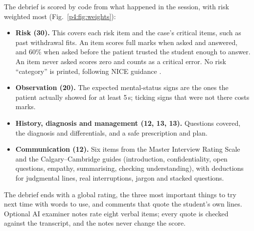\documentclass[journal]{IEEEtran}
\begin{document}
The debrief is scored by code from what happened in the session, with risk weighted most (Fig.~\ref{p4:fig:weights}):
\begin{itemize}
\item \textbf{Risk (30).} This covers each risk item and the case's critical items, such as past withdrawal fits. An item scores full marks when asked and answered, and 60\% when asked before the patient trusted the student enough to answer. An item never asked scores zero and counts as a critical error. No risk ``category'' is printed,
following NICE guidance \cite{nice2022ng225}.
\item \textbf{Observation (20).} The expected mental-status signs are the ones the patient actually showed for at least 5\,s; ticking signs that were not
there costs marks.
\item \textbf{History, diagnosis and management (12, 13, 13).} Questions covered, the diagnosis and differentials, and a safe prescription and plan.
\item \textbf{Communication (12).} Six items from the Master Interview Rating Scale and the Calgary--Cambridge guides \cite{simmenroth2014calgary}
(introduction, confidentiality, open questions, empathy, summarising, checking understanding), with deductions for judgmental lines, real interruptions,
jargon and stacked questions.
\end{itemize}
The debrief ends with a global rating, the three most important things to try next time with words to use, and comments that quote the student's own
lines. Optional AI examiner notes rate eight verbal items; every quote is checked against the transcript, and the notes never change the score.
\end{document}
